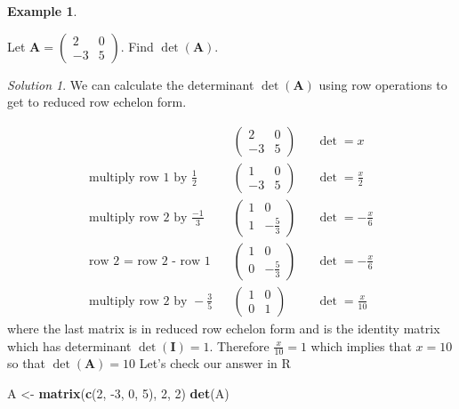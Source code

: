 \documentclass[
]{book}
\newenvironment{Shaded}{\begin{snugshade}}{\end{snugshade}}
\newcommand{\DecValTok}[1]{\textcolor[rgb]{0.00,0.00,0.81}{#1}}
\newcommand{\KeywordTok}[1]{\textcolor[rgb]{0.13,0.29,0.53}{\textbf{#1}}}
\newcommand{\NormalTok}[1]{#1}
\newcommand{\StringTok}[1]{\textcolor[rgb]{0.31,0.60,0.02}{#1}}
\theoremstyle{definition}
\theoremstyle{definition}
\newtheorem{example}{Example}[chapter]
\theoremstyle{definition}
\theoremstyle{remark}
\newtheorem*{solution}{Solution}
\begin{document}
\begin{example}
\protect\hypertarget{exm:unlabeled-div-100}{}\label{exm:unlabeled-div-100}

Let \(\mathbf{A} = \begin{pmatrix} 2 & 0 \\ -3 & 5 \end{pmatrix}\). Find \(\operatorname{det}(\mathbf{A})\).

\end{example}

\begin{solution}

We can calculate the determinant \(\operatorname{det}(\mathbf{A})\) using row operations to get to reduced row echelon form.

\[
\begin{aligned}
&& \begin{pmatrix} 2 & 0 \\ -3 & 5 \end{pmatrix} && \operatorname{det} = x \\
\mbox{multiply row 1 by }\frac{1}{2} && \begin{pmatrix} 1 & 0 \\ -3 & 5  \end{pmatrix} && \operatorname{det} = \frac{x}{2} \\
\mbox{multiply row 2 by }\frac{-1}{3} && \begin{pmatrix} 1 & 0 \\ 1 & -\frac{5}{3} \end{pmatrix} && \operatorname{det} = -\frac{x}{6} \\
\mbox{row 2 = row 2 - row 1} && \begin{pmatrix} 1 & 0 \\ 0 & -\frac{5}{3}  \end{pmatrix} && \operatorname{det} = -\frac{x}{6} \\
\mbox{multiply row 2 by } - \frac{3}{5} && \begin{pmatrix} 1 & 0 \\ 0 & 1  \end{pmatrix} && \operatorname{det} = \frac{x}{10} 
\end{aligned}
\]
where the last matrix is in reduced row echelon form and is the identity matrix which has determinant \(\operatorname{det}(\mathbf{I}) = 1\). Therefore \(\frac{x}{10} = 1\) which implies that \(x = 10\) so that \(\operatorname{det}(\mathbf{A}) = 10\)
Let's check our answer in R

\begin{Shaded}
\begin{Highlighting}[]
\NormalTok{A <-}\StringTok{ }\KeywordTok{matrix}\NormalTok{(}\KeywordTok{c}\NormalTok{(}\DecValTok{2}\NormalTok{, }\DecValTok{-3}\NormalTok{, }\DecValTok{0}\NormalTok{, }\DecValTok{5}\NormalTok{), }\DecValTok{2}\NormalTok{, }\DecValTok{2}\NormalTok{)}
\KeywordTok{det}\NormalTok{(A)}
\end{Highlighting}
\end{Shaded}


\end{solution}
\end{document}
